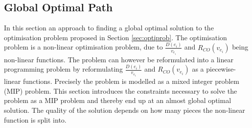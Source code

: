 \subsection{Global Optimal Path}\label{sec:LP}
In this section an approach to finding a global optimal solution to the optimisation problem proposed in Section \ref{sec:optiprob}. The optimisation problem is a non-linear optimisation problem, due to $\frac{D(e_i)}{v_{e_i}}$ and $R_{CO}(v_{e_i})$ being non-linear functions. The problem can however be reformulated into a linear programming problem by reformulating $\frac{D(e_i)}{v_{e_i}}$ and $R_{CO}(v_{e_i})$ as a piecewise-linear functions. Precisely the problem is modelled as a mixed integer problem (MIP) problem. This section introduces the constraints necessary to solve the problem as a MIP problem and thereby end up at an almost global optimal solution. The quality of the solution depends on how many pieces the non-linear function is split into. 

